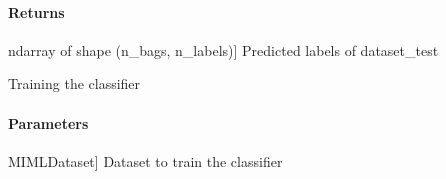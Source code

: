 \documentclass[letterpaper,10pt,english]{sphinxmanual}
\begin{document}
\begin{fulllineitems}
\begin{fulllineitems}
\paragraph{Returns}
\label{\detokenize{classifier/mimlTOmi/_autosummary/miml.classifier.mimlTOmi.miml_to_mi_lp_classifier.MIMLtoMILPClassifier:returns}}\begin{description}
\sphinxlineitem{results}{[}ndarray of shape (n\_bags, n\_labels){]}
\sphinxAtStartPar
Predicted labels of dataset\_test

\end{description}

\end{fulllineitems}


\begin{fulllineitems}
\label{\detokenize{classifier/mimlTOmi/_autosummary/miml.classifier.mimlTOmi.miml_to_mi_lp_classifier.MIMLtoMILPClassifier:miml.classifier.mimlTOmi.miml_to_mi_lp_classifier.MIMLtoMILPClassifier.fit}}
\pysigstartsignatures
{}
\pysigstopsignatures
\sphinxAtStartPar
Training the classifier


\paragraph{Parameters}
\label{\detokenize{classifier/mimlTOmi/_autosummary/miml.classifier.mimlTOmi.miml_to_mi_lp_classifier.MIMLtoMILPClassifier:id1}}\begin{description}
\sphinxlineitem{dataset\_train}{[}MIMLDataset{]}
\sphinxAtStartPar
Dataset to train the classifier

\end{description}

\end{fulllineitems}



\end{fulllineitems}
\end{document}
